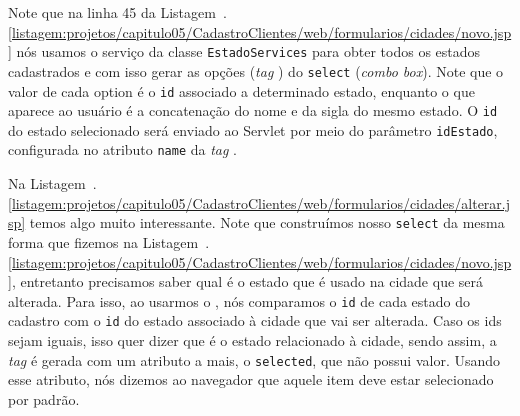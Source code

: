  


Note que na linha 45 da Listagem~\thechapter.\ref{listagem:projetos/capitulo05/CadastroClientes/web/formularios/cidades/novo.jsp} nós usamos o serviço  da classe \texttt{EstadoServices} para obter todos os estados cadastrados e com isso gerar as opções (\textit{tag} ) do \texttt{select} (\textit{combo box}). Note que o valor de cada option é o \texttt{id} associado a determinado estado, enquanto o que aparece ao usuário é a concatenação do nome e da sigla do mesmo estado. O \texttt{id} do estado selecionado será enviado ao Servlet por meio do parâmetro \texttt{idEstado}, configurada no atributo \texttt{name} da \textit{tag} .



Na Listagem~\thechapter.\ref{listagem:projetos/capitulo05/CadastroClientes/web/formularios/cidades/alterar.jsp} temos algo muito interessante. Note que construímos nosso \texttt{select} da mesma forma que fizemos na Listagem~\thechapter.\ref{listagem:projetos/capitulo05/CadastroClientes/web/formularios/cidades/novo.jsp}, entretanto precisamos saber qual é o estado que é usado na cidade que será alterada. Para isso, ao usarmos o , nós comparamos o \texttt{id} de cada estado do cadastro com o \texttt{id} do estado associado à cidade que vai ser alterada. Caso os ids sejam iguais, isso quer dizer que é o estado relacionado à cidade, sendo assim, a \textit{tag}  é gerada com um atributo a mais, o \texttt{selected}, que não possui valor. Usando esse atributo, nós dizemos ao navegador que aquele item deve estar selecionado por padrão.

